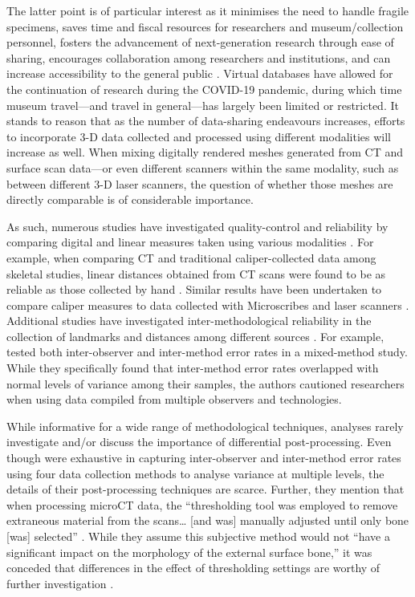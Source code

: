\documentclass[review]{elsarticle}
\begin{document}
The latter point is of particular interest as it minimises the need to handle fragile specimens, saves time and fiscal resources for researchers and museum/collection personnel, fosters the advancement of next-generation research through ease of sharing, encourages collaboration among researchers and institutions, and can increase accessibility to the general public \citep{RN5929,RN5930,RN11508,RN11505,RN726,RN4138,RN5902}. Virtual databases have allowed for the continuation of research during the COVID-19 pandemic, during which time museum travel---and travel in general---has largely been limited or restricted. It stands to reason that as the number of data-sharing endeavours increases, efforts to incorporate 3-D data collected and processed using different modalities will increase as well. When mixing digitally rendered meshes generated from CT and surface scan data---or even different scanners within the same modality, such as between different 3-D laser scanners, the question of whether those meshes are directly comparable is of considerable importance.

As such, numerous studies have investigated quality-control and reliability by comparing digital and linear measures taken using various modalities \citep{RN11474,RN11475,RN11476}. For example, when comparing CT and traditional caliper-collected data among skeletal studies, linear distances obtained from CT scans were found to be as reliable as those collected by hand \citep{RN5894,RN5893,RN5895,RN5896,zonn1989}. Similar results have been undertaken to compare caliper measures to data collected with Microscribes \citep{RN11487,RN11475} and laser scanners \citep{RN5886}. Additional studies have investigated inter-methodological reliability in the collection of landmarks and distances among different sources \citep{RN5879,RN5892,RN11522,RN5897,RN5901}. For example, \citet{RN11945} tested both inter-observer and inter-method error rates in a mixed-method study. While they specifically found that inter-method error rates overlapped with normal levels of variance among their samples, the authors cautioned researchers when using data compiled from multiple observers and technologies. 

While informative for a wide range of methodological techniques, analyses rarely investigate and/or discuss the importance of differential post-processing. Even though \citet[64]{RN11945} were exhaustive in capturing inter-observer and inter-method error rates using four data collection methods to analyse variance at multiple levels, the details of their post-processing techniques are scarce. Further, they mention that when processing microCT data, the ``thresholding tool was employed to remove extraneous material from the scans… [and was] manually adjusted until only bone [was] selected'' \citep[64]{RN11945}. While they assume this subjective method would not “have a significant impact on the morphology of the external surface bone,” it was conceded that differences in the effect of thresholding settings are worthy of further investigation \citep[64]{RN11945}.
\end{document}
